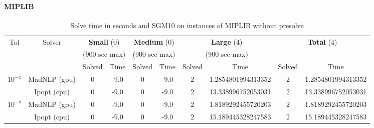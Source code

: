 \documentclass{article}
\begin{document}
\paragraph{MIPLIB}
\begin{table}[t]
  \centering\small
  \caption{Solve time in seconds and SGM10 on instances of MIPLIB without presolve}
  \begin{tabular}{|c|c|cc|cc|cc|cc|}
  \hline
  \multirow{ 3}{*}{Tol} & \multirow{ 3}{*}{Solver} & \multicolumn{2}{c|}{\textbf{Small} (0)}& \multicolumn{2}{c|}{\textbf{Medium} (0)}& \multicolumn{2}{c|}{\textbf{Large} (4)}& \multicolumn{2}{c|}{\multirow{2}{*}{\textbf{Total} (4)}}\\
                        && \multicolumn{2}{c|}{(900 sec max)}& \multicolumn{2}{c|}{(900 sec max)}& \multicolumn{2}{c|}{(900 sec max)}&&\\
                        &&  Solved & Time &  Solved & Time &  Solved & Time &  Solved & Time \\
  \hline
    \multirow{2}{*}{$10^{-4}$} & MadNLP (gpu) & 0 & -9.0 & 0 & -9.0 & 2 & 1.2854801994313352 & 2 & 1.2854801994313352  \\
                        & Ipopt (cpu) & 0 & -9.0 & 0 & -9.0 & 2 & 13.338996752053031 & 2 & 13.338996752053031  \\

  \hline
    \multirow{2}{*}{$10^{-4}$} & MadNLP (gpu) & 0 & -9.0 & 0 & -9.0 & 2 & 1.8189292455720203 & 2 & 1.8189292455720203  \\
                        & Ipopt (cpu) & 0 & -9.0 & 0 & -9.0 & 2 & 15.189445328247583 & 2 & 15.189445328247583  \\


\end{tabular}
\end{table}
\end{document}
